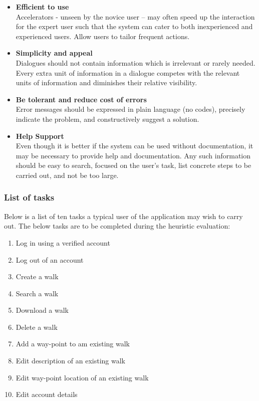 \documentclass[11pt,a4paper]{article}
\begin{document}
\begin{itemize}
  \item \textbf{Efficient to use}\\ Accelerators - unseen by the novice user -- may often speed up the interaction for the expert user such that the system can cater to both inexperienced and experienced users. Allow users to tailor frequent actions.
  \item \textbf{Simplicity and appeal}\\ Dialogues should not contain information which is irrelevant or rarely needed. Every extra unit of information in a dialogue competes with the relevant units of information and diminishes their relative visibility.
  \item \textbf{Be tolerant and reduce cost of errors}\\ Error messages should be expressed in plain language (no codes), precisely indicate the problem, and constructively suggest a solution.
  \item \textbf{Help Support}\\ Even though it is better if the system can be used without documentation, it may be necessary to provide help and documentation. Any such information should be easy to search, focused on the user's task, list concrete steps to be carried out, and not be too large.
  
\end{itemize}

\subsubsection{List of tasks}

Below is a list of ten tasks a typical user of the application may wish to carry out. The below tasks are to be completed during the heuristic evaluation:\\

\begin{enumerate}
  \item Log in using a verified account
  \item Log out of an account
  \item Create a walk
  \item Search a walk
  \item Download a walk
  \item Delete a walk
  \item Add a way-point to am existing walk
  \item Edit description of an existing walk
  \item Edit way-point location of an existing walk
  \item Edit account details
\end{enumerate}
\end{document}
